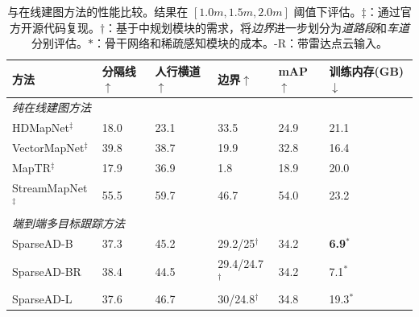 \begin{table}[t]
		\caption{与在线建图方法的性能比较。结果在 $[1.0m, 1.5m, 2.0m]$ 阈值下评估。$\ddag$：通过官方开源代码复现。$\dag$：基于\model 中规划模块的需求，将\textit{边界}进一步划分为\textit{道路段}和\textit{车道}分别评估。$*$：骨干网络和稀疏感知模块的成本。-R：带雷达点云输入。}
	        \vspace{-10pt}
	        \tiny
		\begin{center}
	            {
				\begin{tabular}{l|p{1.3cm}<{\centering}p{1.3cm}<{\centering}p{2cm}<{\centering}p{1cm}<{\centering}p{3.0cm}<{\centering}}
					\toprule
					方法 & \textbf{分隔线}$\uparrow$& \textbf{人行横道}$\uparrow$ & \textbf{边界}$\uparrow$ & mAP$\uparrow$ & 训练内存(GB)$\downarrow$\\
	                \midrule
	                \multicolumn{6}{l}{\textit{纯在线建图方法}}\\
	                \midrule
					HDMapNet$^\ddag$ \cite{li2022hdmapnet} & 18.0 & 23.1 & 33.5 & 24.9  & 21.1\\
					VectorMapNet$^\ddag$ \cite{liu2023vectormapnet}  & 39.8 &  38.7 & 19.9 & 32.8 &16.4\\
					MapTR$^\ddag$ \cite{liao2022maptr}  & 17.9 &  36.9 & 1.8 & 18.9 & 20.0\\
				  StreamMapNet$^\ddag$ \cite{yuan2024streammapnet} & 55.5 &  59.7 & 46.7 & 54.0 &23.2\\
					\midrule
	                \multicolumn{6}{l}{\textit{端到端多目标跟踪方法}}\\
	                \midrule
					\rowcolor[gray]{.9} {SparseAD-B}  & {37.3}& {45.2} & {29.2/25}$^\dag$ & {34.2} & \textbf{6.9}$^*$\\
	                    \rowcolor[gray]{.9} {SparseAD-BR}  & {38.4}& {44.5} & {29.4/24.7}$^\dag$ & {34.2} & 7.1$^*$\\
	                    \rowcolor[gray]{.9} {SparseAD-L}  & {37.6}& {46.7} & {30/24.8}$^\dag$ & {34.8} & 19.3$^*$\\
	                \bottomrule
				\end{tabular}
			}
		\end{center}
		\label{tab:map-nuscenes-val}
	         \vspace{-10pt}
	\end{table}